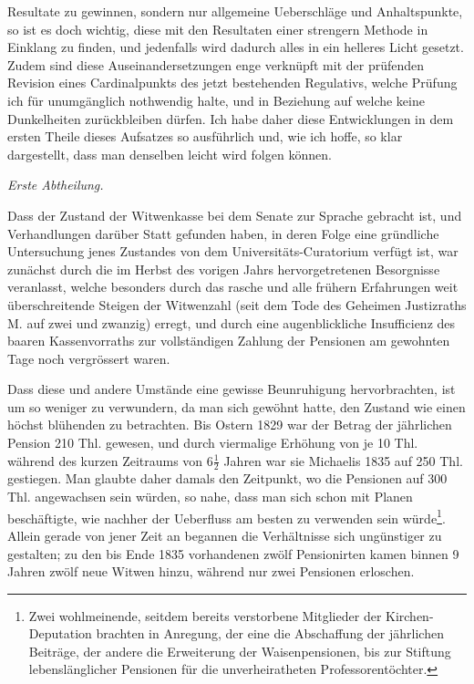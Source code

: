 Resultate zu gewinnen, sondern nur allgemeine Ueberschläge und Anhaltspunkte, so ist es doch wichtig, diese mit den Resultaten einer strengern Methode in Einklang zu finden, und jedenfalls wird dadurch alles in ein helleres Licht gesetzt. Zudem sind diese Auseinandersetzungen enge verknüpft mit der prüfenden Revision eines Cardinalpunkts des jetzt bestehenden Regulativs, welche Prüfung ich für unumgänglich nothwendig halte, und in Beziehung auf welche keine Dunkelheiten zurückbleiben dürfen. Ich habe daher diese Entwicklungen in dem ersten Theile dieses Aufsatzes so ausführlich und, wie ich hoffe, so klar dargestellt, dass man denselben leicht wird folgen können.

\begin{center}\textit{Erste Abtheilung.}\end{center}
\noindent\hspace*{\parindent}Dass der Zustand der Witwenkasse bei dem Senate zur Sprache gebracht ist, und Verhandlungen darüber Statt gefunden haben, in deren Folge eine gründliche Untersuchung jenes Zustandes von dem Universitäts-Curatorium verfügt ist, war zunächst durch die im Herbst des vorigen Jahrs hervorgetretenen Besorgnisse veranlasst, welche besonders durch das rasche und alle frühern Erfahrungen weit überschreitende Steigen der Witwenzahl (seit dem Tode des Geheimen Justizraths M. auf zwei und zwanzig) erregt, und durch eine augenblickliche Insufficienz des baaren Kassenvorraths zur vollständigen Zahlung der Pensionen am gewohnten Tage noch vergrössert waren.

Dass diese und andere Umstände eine gewisse Beunruhigung hervorbrachten, ist um so weniger zu verwundern, da man sich gewöhnt hatte, den Zustand wie einen höchst blühenden zu betrachten. Bis Ostern 1829 war der Betrag der jährlichen Pension 210 Thl. gewesen, und durch viermalige Erhöhung von je 10 Thl. während des kurzen Zeitraums von \(6\tfrac12\) Jahren war sie Michaelis 1835 auf 250 Thl. gestiegen. Man glaubte daher damals den Zeitpunkt, wo die Pensionen auf 300 Thl. angewachsen sein würden, so nahe, dass man sich schon mit Planen beschäftigte, wie nachher der Ueberfluss am besten zu verwenden sein würde\footnote{Zwei wohlmeinende, seitdem bereits verstorbene Mitglieder der Kirchen-Deputation brachten in Anregung, der eine die Abschaffung der jährlichen Beiträge, der andere die Erweiterung der Waisenpensionen, bis zur Stiftung lebenslänglicher Pensionen für die unverheiratheten Professorentöchter.}. Allein gerade von jener Zeit an begannen die Verhältnisse sich ungünstiger zu gestalten; zu den bis Ende 1835 vorhandenen zwölf Pensionirten kamen binnen 9 Jahren zwölf neue Witwen hinzu, während nur zwei Pensionen erloschen.

